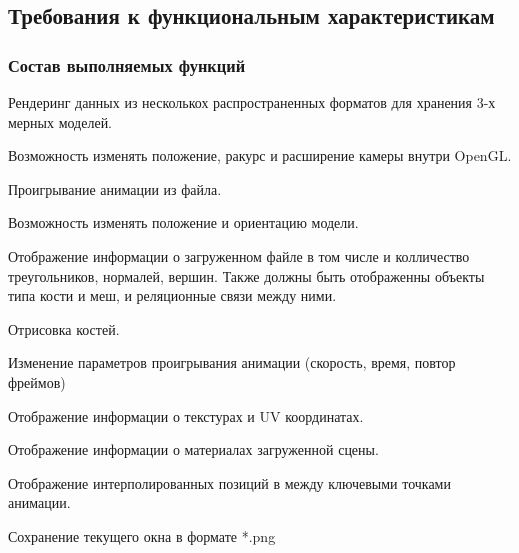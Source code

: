 

\subsection{Требования к функциональным характеристикам}
\subsubsection{Состав выполняемых функций}
\begin{my_enumerate}
\item Рендеринг данных из несколькох распространенных форматов для хранения 3-х мерных моделей.
\item Возможность изменять положение, ракурс и расширение камеры внутри OpenGL.
\item Проигрывание анимации из файла.
\item Возможность изменять положение и ориентацию модели.
\item Отображение информации о загруженном файле в том числе и колличество треугольников, нормалей, вершин. Также должны быть отображенны объекты типа кости и меш, и реляционные связи между ними. 
\item Отрисовка костей.
\item Изменение параметров проигрывания анимации (скорость, время, повтор фреймов)
\item Отображение информации о текстурах и UV координатах.
\item Отображение информации о материалах загруженной сцены.
\item Отображение интерполированных позиций в между ключевыми точками анимации.
\item Сохранение текущего окна в формате *.png
\end{my_enumerate}

